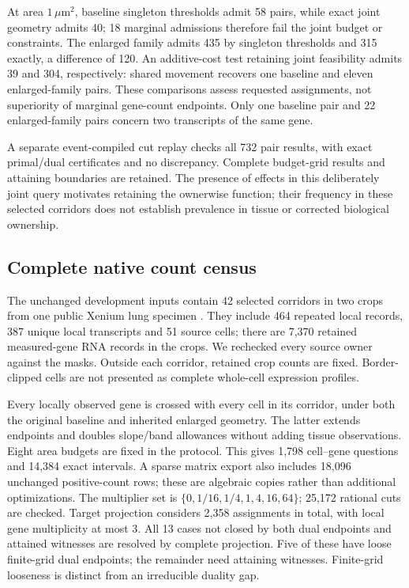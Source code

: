 \documentclass[10pt,letterpaper]{article}
\begin{document}
At area $1\,\mu$m$^2$, baseline singleton thresholds admit 58 pairs, while exact joint geometry admits 40; 18 marginal admissions therefore fail the joint budget or constraints. The enlarged family admits 435 by singleton thresholds and 315 exactly, a difference of 120. An additive-cost test retaining joint feasibility admits 39 and 304, respectively: shared movement recovers one baseline and eleven enlarged-family pairs. These comparisons assess requested assignments, not superiority of marginal gene-count endpoints. Only one baseline pair and 22 enlarged-family pairs concern two transcripts of the same gene.

A separate event-compiled cut replay checks all 732 pair results, with exact primal/dual certificates and no discrepancy. Complete budget-grid results and attaining boundaries are retained. The presence of effects in this deliberately joint query motivates retaining the ownerwise function; their frequency in these selected corridors does not establish prevalence in tissue or corrected biological ownership.

\subsection{Complete native count census}
The unchanged development inputs contain 42 selected corridors in two crops from one public Xenium lung specimen \cite{dataset}. They include 464 repeated local records, 387 unique local transcripts and 51 source cells; there are 7,370 retained measured-gene RNA records in the crops. We rechecked every source owner against the masks. Outside each corridor, retained crop counts are fixed. Border-clipped cells are not presented as complete whole-cell expression profiles.

Every locally observed gene is crossed with every cell in its corridor, under both the original baseline and inherited enlarged geometry. The latter extends endpoints and doubles slope/band allowances without adding tissue observations. Eight area budgets are fixed in the protocol. This gives 1,798 cell--gene questions and 14,384 exact intervals. A sparse matrix export also includes 18,096 unchanged positive-count rows; these are algebraic copies rather than additional optimizations. The multiplier set is \(\{0,1/16,1/4,1,4,16,64\}\); 25,172 rational cuts are checked. Target projection considers 2,358 assignments in total, with local gene multiplicity at most 3. All 13 cases not closed by both dual endpoints and attained witnesses are resolved by complete projection. Five of these have loose finite-grid dual endpoints; the remainder need attaining witnesses. Finite-grid looseness is distinct from an irreducible duality gap.
\end{document}
